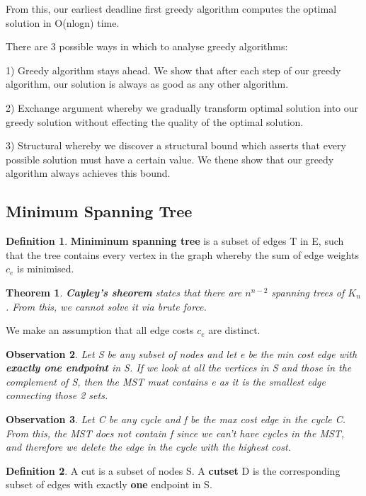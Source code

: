 \documentclass[11pt, oneside]{article}
\newtheorem{theorem}{Theorem}
\newtheorem{observation}[theorem]{\textbf{Observation}}
\theoremstyle{definition}
\newtheorem{definition}{Definition}[section]
\begin{document}
From this, our earliest deadline first greedy algorithm computes the optimal solution in O(nlogn) time.

There are 3 possible ways in which to analyse greedy algorithms:

1) Greedy algorithm stays ahead. We show that after each step of our greedy algorithm, our solution is always as good as any other algorithm.

2) Exchange argument whereby we gradually transform optimal solution into our greedy solution without effecting the quality of the optimal solution.

3) Structural whereby we discover a structural bound which asserts that every possible solution must have a certain value. We thene show that our greedy algorithm always achieves this bound.

\subsection{Minimum Spanning Tree}
\begin{definition}
\textbf{Miniminum spanning tree} is a subset of edges T in E, such that the tree contains every vertex in the graph whereby the sum of edge weights $c_e$ is minimised.
\end{definition}

\begin{theorem}
  \textbf{Cayley's sheorem} states that there are $n^{n-2}$ spanning trees of $K_n$. From this, we cannot solve it via brute force.
\end{theorem}

We make an assumption that all edge costs $c_e$ are distinct.

\begin{observation}
  Let S be any subset of nodes and let e be the min cost edge with \textbf{exactly one endpoint} in S. If we look at all the vertices in S and those in the complement of S, then the MST must contains e as it is the smallest edge connecting those 2 sets.
\end{observation}

\begin{observation}
  Let C be any cycle and f be the max cost edge in the cycle C. From this, the MST does not contain f since we can't have cycles in the MST, and therefore we delete the edge in the cycle with the highest cost.
\end{observation}

\begin{definition}
  A cut is a subset of nodes S. A \textbf{cutset} D is the corresponding subset of edges with exactly \textbf{one} endpoint in S.
\end{definition}
\end{document}
